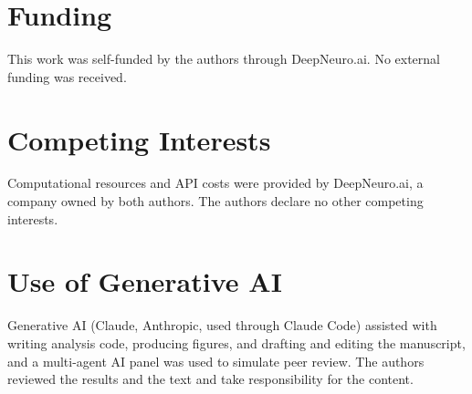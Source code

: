 \documentclass{article}
\begin{document}
\section*{Funding}
This work was self-funded by the authors through DeepNeuro.ai. No external funding
was received.

\section*{Competing Interests}
Computational resources and API costs were provided by DeepNeuro.ai, a company
owned by both authors. The authors declare no other competing interests.

\section*{Use of Generative AI}
Generative AI (Claude, Anthropic, used through Claude Code) assisted with writing
analysis code, producing figures, and drafting and editing the manuscript, and a
multi-agent AI panel was used to simulate peer review. The authors reviewed the
results and the text and take responsibility for the content.




\newpage
\appendix

\end{document}
